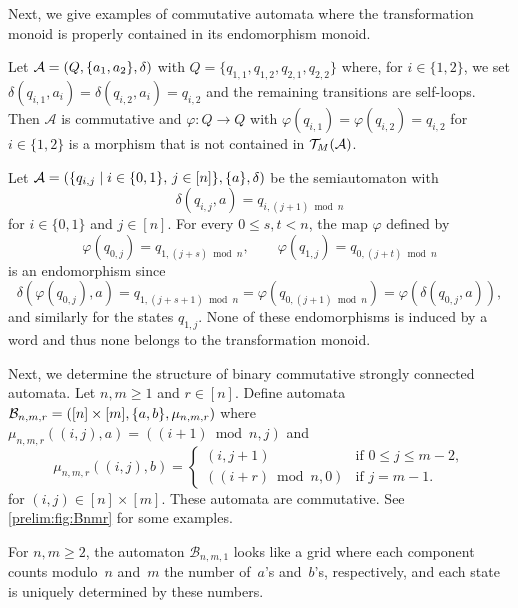 Next, we give examples of commutative automata 
where the transformation monoid is properly contained in its endomorphism monoid. 

\begin{example}
	Let $\mathcal A = (Q, \{a_1,a_2\}, \delta)$ 
	with $Q = \{ q_{1,1}, q_{1,2}, q_{2,1}, q_{2,2} \}$
	where, for $i \in \{1,2\}$, we
	set $\delta(q_{i,1}, a_i) = \delta(q_{i,2}, a_i) = q_{i,2}$
	and the remaining transitions are self-loops.
	Then $\mathcal A$ is commutative and 
	$\varphi \colon Q \to Q$ with $\varphi(q_{i,1}) = \varphi(q_{i,2}) = q_{i,2}$
	for $i \in \{1,2\}$ is a morphism that is not contained
	in $\mathcal T_M(\mathcal A)$.	
\end{example}

\begin{example}
	Let $\mathcal A = (\{ q_{i,j} \mid i \in \{0,1\},\, j \in [n] \}, \{a\}, \delta)$
	be the semiautomaton with
	\[
	\delta(q_{i,j}, a) = q_{i,(j+1)\bmod n}
	\]
	for $i \in \{0,1\}$ and $j \in [n]$.
	For every $0 \le s,t < n$, the map $\varphi$ defined by
	\[
	\varphi(q_{0,j}) = q_{1,(j+s)\bmod n},
	\qquad
	\varphi(q_{1,j}) = q_{0,(j+t)\bmod n}
	\]
	is an endomorphism since
	\[
	\delta(\varphi(q_{0,j}),a)
	= q_{1,(j+s+1)\bmod n}
	= \varphi(q_{0,(j+1)\bmod n})
	= \varphi(\delta(q_{0,j},a)),
	\]
	and similarly for the states $q_{1,j}$.
	None of these endomorphisms is induced by a word and thus
	none belongs to the transformation monoid.
\end{example}

\label{def:grid-aut}
Next, we determine the structure of binary commutative strongly connected automata.
Let $n,m \ge 1$ and $r \in [n]$.
Define automata $\mathcal B_{n,m, r} = ([n] \times [m], \{a,b\}, \mu_{n,m,r})$
where $\mu_{n,m, r}((i,j), a) = ( (i+1) \bmod{n}, j )$
and 
\[
\mu_{n,m, r}((i,j), b)
= \begin{cases}
	(i, j + 1) & \text{if } 0 \le j \le m - 2, \\
	((i + r) \bmod n, 0) & \text{if } j = m - 1. 		
\end{cases}
\]	
for $(i,j) \in [n] \times [m]$. These automata are commutative. See \cref{prelim:fig:Bnmr} for some examples.

\begin{remark}
	For $n,m \ge 2$, the automaton $\mathcal B_{n,m,1}$ looks like
	a grid where each component counts modulo~$n$
	and~$m$ the number of~$a$'s and~$b$'s, respectively,
	and each state is uniquely determined by these numbers.
\end{remark}

